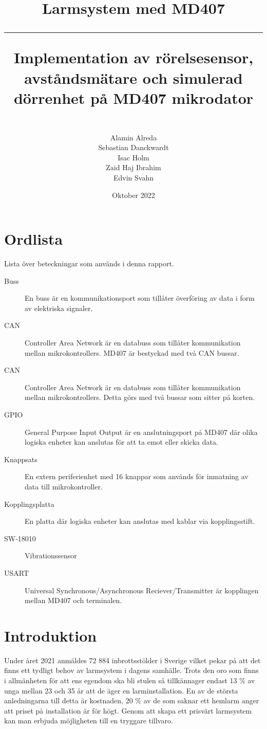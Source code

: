 \documentclass{article}
\title{\textbf{Larmsystem med MD407}\\ 
     \hspace{10cm}
     \hrule
    \hspace{10cm}
    Implementation av rörelsesensor, avståndsmätare och simulerad dörrenhet på MD407 mikrodator}
\author{\\Alamin Alreda\\Sebastian Danckwardt\\Isac Holm\\Zaid Haj Ibrahim\\Edvin Svahn}
\date{Oktober 2022}
\begin{document}
\maketitle
\newpage
\tableofcontents
\newpage
\section*{Ordlista}
Lista över beteckningar som används i denna rapport.
\begin{description}


\item[Buss] En buss är en kommunikationsport som tillåter överföring av data i form av elektriska signaler.

\item[CAN] Controller Area Network är en databuss som tillåter kommunikation mellan mikrokontrollers. MD407 är bestyckad med två CAN bussar.

\item[CAN] Controller Area Network är en databuss som tillåter kommunikation mellan mikrokontrollers. Detta görs med två bussar som sitter på korten.

\item[GPIO] General Purpose Input Output är en anslutningsport på MD407 där olika logiska enheter kan anslutas för att ta emot eller skicka data.

\item[Knappsats] En extern periferienhet med 16 knappar som används för inmatning av data till mikrokontroller.

\item[Kopplingsplatta] En platta där logiska enheter kan anslutas med kablar via kopplingsstift.

\item[SW-18010] Vibrationssensor

\item[USART] Universal Synchronous/Asynchronous Reciever/Transmitter är kopplingen mellan MD407 och terminalen.

\end{description}
 \newpage

\setcounter{page}{1}
\section{Introduktion}

Under året 2021 anmäldes 72 884 inbrottsstölder i Sverige vilket pekar på att det finns ett tydligt behov av larmsystem i dagens samhälle.\cite{BRa} Trots den oro som finns i allmänheten för att ens egendom ska bli stulen så tillkännager endast 13 \% av unga mellan 23 och 35 år att de äger en larminstallation.\cite{MoFor} En av de största anledningarna till detta är kostnaden, 20 \% av de som saknar ett hemlarm anger att priset på installation är för högt.\cite{MoFor} Genom att skapa ett prisvärt larmsystem kan man erbjuda möjligheten till en tryggare tillvaro.
\end{document}
